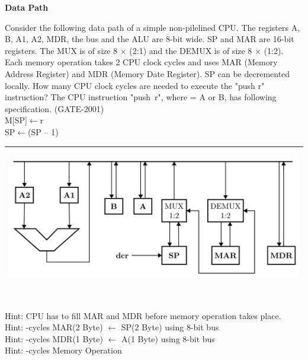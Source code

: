 
\centerline{\textbf{ \LARGE Data Path }}

\begin{questyle}
  \question  Consider the following data path of a simple non-pilelined CPU. The registers A, B, A1, A2, MDR,
             the bus and the ALU are 8-bit wide. SP and MAR are 16-bit registers. The MUX is of
             size 8 × (2:1) and the DEMUX is of size 8 × (1:2). Each memory operation takes 2 CPU
             clock cycles and uses MAR (Memory Address Register) and MDR (Memory Date Register).
             SP can be decremented locally. How many CPU clock cycles are needed to execute the
             "push r" instruction? The CPU instruction \mbox{"push r"}, where = A or B, has
             following specification. (GATE-2001) \\ M[SP]\(\leftarrow\)r \\ SP\(\leftarrow\)(SP – 1)

             \begin{myTableStyle} \begin{tabular}{ |m{14cm}| } \hline
                  \begin{center} \includegraphics[scale=0.3]{./images/data_path_01.png} \end{center}\\ \hline
            \end{tabular} \end{myTableStyle} \vspace{0.08in}

  \begin{oneparchoices}
  \end{oneparchoices}
  \\ Hint: \qquad CPU has to fill MAR and MDR before memory operation takes place.
  \\ Hint: -cycles \qquad \qquad MAR(2 Byte) \(\leftarrow\) SP(2 Byte) \quad using 8-bit bus
  \\ Hint: -cycles \qquad \qquad MDR(1 Byte) \(\leftarrow\) A(1 Byte) \quad using 8-bit bus
  \\ Hint: -cycles \qquad \qquad Memory Operation
\end{questyle}

